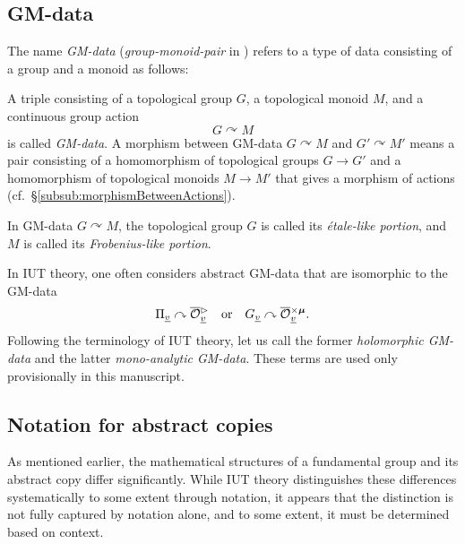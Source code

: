 \documentclass[12pt, reqno, a4paper]{amsart}
\def\udl#1{\underline{#1}} %
\def\acton{\curvearrowright} %
\def\uv{\udl{v}} %
\begin{document}
\subsection{GM-data}\label{sub:GMdata}
The name {\it GM-data} ({\it group-monoid-pair} in \cite[Def.\ 5.1]{MR4491969}) refers to a type of data consisting of a group and a monoid as follows:
\begin{dfn}[{cf.\ \cite[Def.\ 5.1]{MR4491969}}]\label{dfn:GMdata}
A triple consisting of a topological group $G$, a topological monoid $M$, and a continuous group action
$$
G\acton M
$$
is called {\em GM-data}.
A morphism between GM-data $G\acton M$ and $G'\acton M'$ means a pair consisting of a homomorphism of topological groups $G\to G'$ and a homomorphism of topological monoids $M\to M'$ that gives a morphism of actions (cf.\ \S\ref{subsub:morphismBetweenActions}).
\end{dfn}

In GM-data $G\acton M$, the topological group $G$ is called its {\em \'etale-like portion}, and $M$ is called its {\em Frobenius-like portion}.

In IUT theory, one often considers abstract GM-data that are isomorphic to the GM-data
\begin{equation*}
\Pi_{\uv}\acton\oOOt_{\uv}\quad\text{or}\quad \GG_{\uv}\acton \oOOxmu_{\uv}.
\end{equation*}
Following the terminology of IUT theory, let us call the former {\em holomorphic GM-data} and the latter {\em mono-analytic GM-data}. These terms are used only provisionally in this manuscript.


\subsection{Notation for abstract copies}\label{sub:abstractCopies}

As mentioned earlier, the mathematical structures of a fundamental group and its abstract copy differ significantly. While IUT theory distinguishes these differences systematically to some extent through notation, it appears that the distinction is not fully captured by notation alone, and to some extent, it must be determined based on context.
\end{document}
